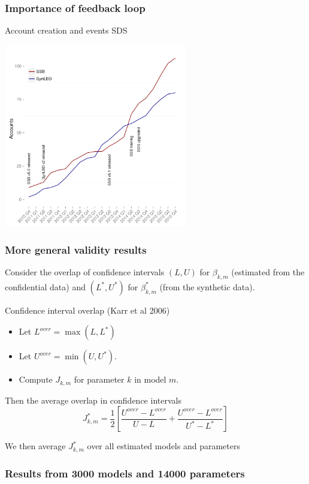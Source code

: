 \begin{frame}
	\frametitle{Importance of feedback loop}
	\begin{block}{Account creation and events SDS}
		\centering
		
		\includegraphics[width=0.6\textwidth]{report_on_SDS_2015_SOLE-accounts}
	\end{block}
\end{frame}

\begin{frame}
	\frametitle{More general validity results}
	Consider the overlap of confidence intervals $(L,U)$ for $\beta_{k,m}$ (estimated from the confidential data) and $(L^{*},U^{*})$ for $\beta_{k,m}^*$ (from the synthetic data).
	\begin{block}{Confidence interval overlap (Karr et al 2006)}
		\begin{itemize}
			\item[\ ]  Let $L^{over} = \max (L,L^{*} )$ 
			\item[\ ]  Let $U^{over} = \min (U,U^{*})$. 
			\item[\ ] Compute $J_{k,m}$ for parameter $k$ in model $m$. 
	\end{itemize}
Then the average overlap in confidence intervals 		
$$
J_{k,m}^{*} = \frac{1}{2} \left [ \frac{U^{over} - L^{over}}{U-L} + \frac{U^{over} - L^{over}}{U^*-L ^*}        \right ]
$$

We then average $J_{k,m}^{*}$ over all estimated models and parameters
\end{block}
\end{frame}


\begin{frame}
	\frametitle{Results from 3000 models and 14000 parameters}




\end{frame}

